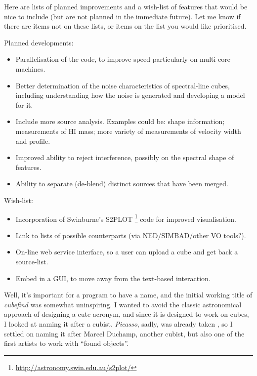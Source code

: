 
Here are lists of planned improvements and a wish-list of
features that would be nice to include (but are not planned in the
immediate future). Let me know if there are items not on these lists,
or items on the list you would like prioritised.

Planned developments:
\begin{itemize}
\item Parallelisation of the code, to improve speed particularly on
multi-core machines.

\item Better determination of the noise characteristics of
  spectral-line cubes, including understanding how the noise is
  generated and developing a model for it. 
  
\item Include more source analysis. Examples could be: shape
  information; measurements of HI mass; more variety of measurements
  of velocity width and profile. 

\item Improved ability to reject interference, possibly on the
  spectral shape of features.

\item Ability to separate (de-blend) distinct sources that have been
  merged.
\end{itemize}

Wish-list:
\begin{itemize}
\item Incorporation of Swinburne's S2PLOT
\footnote{\href{http://astronomy.swin.edu.au/s2plot/}
{http://astronomy.swin.edu.au/s2plot/}} code for improved
visualisation. 
\item Link to lists of possible counterparts (\eg via NED/SIMBAD/other
  VO tools?). 

\item On-line web service interface, so a user can upload a cube and
  get back a source-list.

\item Embed \duchamp in a GUI, to move away from the text-based
  interaction.
\end{itemize}


Well, it's important for a program to have a name, and the initial
working title of \emph{cubefind} was somewhat uninspiring. I wanted to
avoid the classic astronomical approach of designing a cute acronym,
and since it is designed to work on cubes, I looked at naming it after
a cubist. \emph{Picasso}, sadly, was already taken \citep{minchin99},
so I settled on naming it after Marcel Duchamp, another cubist, but
also one of the first artists to work with ``found objects''.


